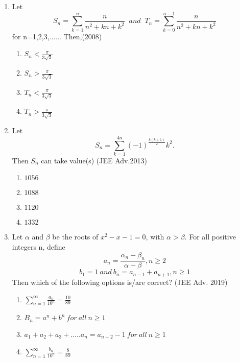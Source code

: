 \documentclass[journal,12pt,twocolumn]{IEEEtran}
\theoremstyle{remark}
\begin{document}
\begin{enumerate}
\item Let \begin{equation*}S_n=\sum_{k=1}^{n}\frac{n}{n^2+kn+k^2}\;\;and\;\; T_n=\sum_{k=0}^{n-1}\frac{n}{n^2+kn+k^2}\end{equation*}for\;\; n=1,2,3,...... Then,\hfill{(2008)}
\begin{multicols}{2}
\begin{enumerate}
\item $S_n<\frac{\pi}{3\sqrt{3}}$
\item $S_n>\frac{\pi}{3\sqrt{3}}$
\item $T_n<\frac{\pi}{3\sqrt{3}}$
\item $T_n>\frac{\pi}{3\sqrt{3}}$
\end{enumerate}
\end{multicols}

\item Let \begin{equation*} S_n=\sum_{k=1}^{4n}(-1)^\frac{k(k+1)}{2}k^2.\end{equation*}  Then $S_n$ can take value(s)  \hfill{(JEE Adv.2013)}
\begin{multicols}{2}
\begin{enumerate}
\item $1056$
\item $1088$
\item $1120$
\item $1332$
\end{enumerate}
\end{multicols}

\item Let $\alpha$ and $\beta$ be the roots of $x^2-x-1=0$, with $\alpha>\beta$. For all positive integers n, define
\begin{equation*}
a_n=\frac{\alpha_n-\beta_n}{\alpha-\beta},n\geq2
\end{equation*}
\begin{equation*}
b_1=1\:and\:b_n=a_{n-1}+a_{n+1},n\geq1
\end{equation*}
Then which of the following options is/are correct?
\hfill{(JEE Adv. 2019)}
\begin{enumerate}
\item $\sum_{n=1}^{\infty}\frac{a_n}{10^n}=\frac{10}{89}$
\item $B_n=a^n+b^n\:for\: all\: n\geq1$
\item $a_1+a_2+a_3+.....a_n=a_{n+2}-1\: for\: all\: n\geq1$
\item $\sum_{n=1}^{\infty}\frac{b_n}{10^n}=\frac{8}{89}$
\end{enumerate}
\end{enumerate}
\end{document}
